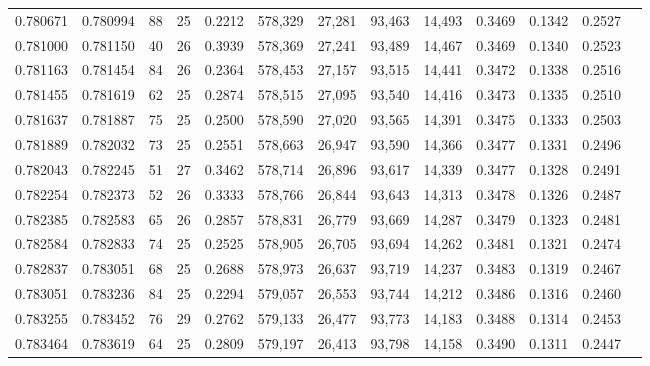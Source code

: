 \begin{tabular}{rrrrrrrrrrrrr}
0.780671 & 0.780994 &    88 &  25 &                                     0.2212 & 578,329 &  27,281 &  93,463 &  14,493 & 0.3469 & 0.1342 & 0.2527 \\
0.781000 & 0.781150 &    40 &  26 &                                     0.3939 & 578,369 &  27,241 &  93,489 &  14,467 & 0.3469 & 0.1340 & 0.2523 \\
0.781163 & 0.781454 &    84 &  26 &                                     0.2364 & 578,453 &  27,157 &  93,515 &  14,441 & 0.3472 & 0.1338 & 0.2516 \\
0.781455 & 0.781619 &    62 &  25 &                                     0.2874 & 578,515 &  27,095 &  93,540 &  14,416 & 0.3473 & 0.1335 & 0.2510 \\
0.781637 & 0.781887 &    75 &  25 &                                     0.2500 & 578,590 &  27,020 &  93,565 &  14,391 & 0.3475 & 0.1333 & 0.2503 \\
0.781889 & 0.782032 &    73 &  25 &                                     0.2551 & 578,663 &  26,947 &  93,590 &  14,366 & 0.3477 & 0.1331 & 0.2496 \\
0.782043 & 0.782245 &    51 &  27 &                                     0.3462 & 578,714 &  26,896 &  93,617 &  14,339 & 0.3477 & 0.1328 & 0.2491 \\
0.782254 & 0.782373 &    52 &  26 &                                     0.3333 & 578,766 &  26,844 &  93,643 &  14,313 & 0.3478 & 0.1326 & 0.2487 \\
0.782385 & 0.782583 &    65 &  26 &                                     0.2857 & 578,831 &  26,779 &  93,669 &  14,287 & 0.3479 & 0.1323 & 0.2481 \\
0.782584 & 0.782833 &    74 &  25 &                                     0.2525 & 578,905 &  26,705 &  93,694 &  14,262 & 0.3481 & 0.1321 & 0.2474 \\
0.782837 & 0.783051 &    68 &  25 &                                     0.2688 & 578,973 &  26,637 &  93,719 &  14,237 & 0.3483 & 0.1319 & 0.2467 \\
0.783051 & 0.783236 &    84 &  25 &                                     0.2294 & 579,057 &  26,553 &  93,744 &  14,212 & 0.3486 & 0.1316 & 0.2460 \\
0.783255 & 0.783452 &    76 &  29 &                                     0.2762 & 579,133 &  26,477 &  93,773 &  14,183 & 0.3488 & 0.1314 & 0.2453 \\
0.783464 & 0.783619 &    64 &  25 &                                     0.2809 & 579,197 &  26,413 &  93,798 &  14,158 & 0.3490 & 0.1311 & 0.2447 \\

\end{tabular}
